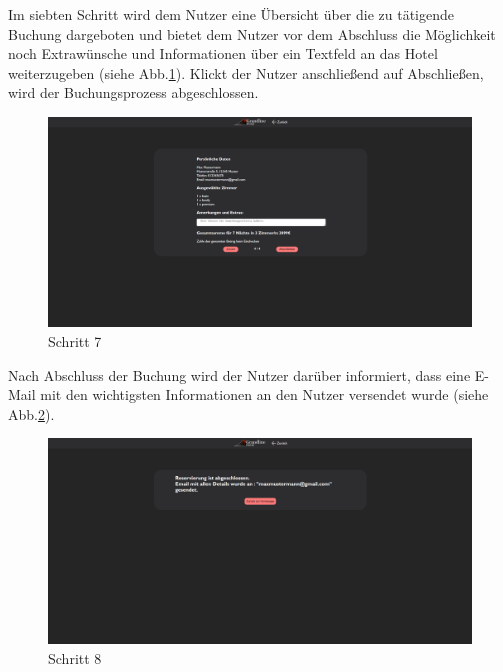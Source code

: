 \newline
Im siebten Schritt wird dem Nutzer eine Übersicht über die zu tätigende Buchung dargeboten und bietet dem Nutzer vor dem Abschluss die Möglichkeit noch Extrawünsche und Informationen über ein Textfeld an das Hotel weiterzugeben (siehe Abb.\ref{step7}). Klickt der Nutzer anschließend auf \glqq Abschließen\grqq, wird der Buchungsprozess abgeschlossen.
\begin{figure}
	\includegraphics[width=\textwidth]{images/Beispiel/Schritt7.png}
	\caption{Schritt 7}
	\label{step7}
\end{figure}
\newpage
Nach Abschluss der Buchung wird der Nutzer darüber informiert, dass eine E-Mail mit den wichtigsten Informationen an den Nutzer versendet wurde (siehe Abb.\ref{step8}).
\begin{figure}
	\includegraphics[width=\textwidth]{images/Beispiel/Schritt8.png}
	\caption{Schritt 8}
	\label{step8}
\end{figure}